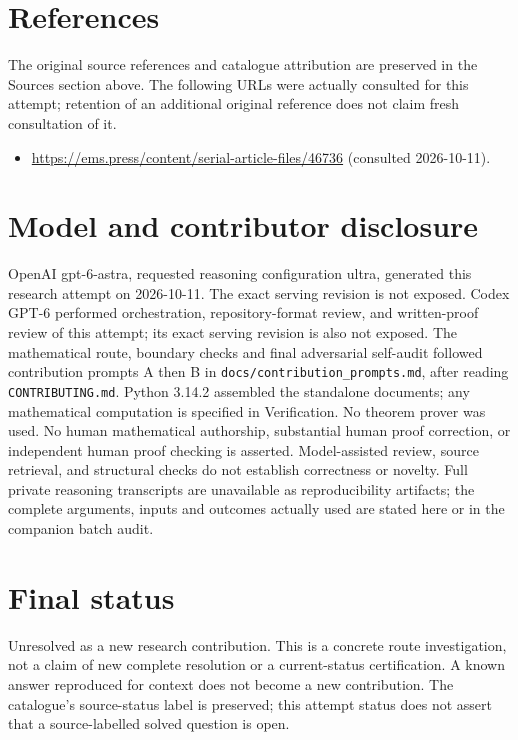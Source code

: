 \documentclass[11pt]{article}
\begin{document}
\section{References}
The original source references and catalogue attribution are preserved in the
Sources section above. The following URLs were actually consulted for this attempt;
retention of an additional original reference does not claim fresh consultation of it.
\begin{itemize}
\item \url{https://ems.press/content/serial-article-files/46736} (consulted 2026-10-11). 
\end{itemize}
\section{Model and contributor disclosure}
OpenAI gpt-6-astra, requested reasoning configuration ultra, generated this research
attempt on 2026-10-11. The exact serving revision is not exposed. Codex GPT-6
performed orchestration, repository-format review, and written-proof review of this attempt; its exact serving revision
is also not exposed. The mathematical route, boundary checks and final adversarial
self-audit followed contribution prompts A then B in
\texttt{docs/contribution\_prompts.md}, after reading \texttt{CONTRIBUTING.md}.
Python 3.14.2 assembled the standalone documents; any mathematical computation is
specified in Verification. No theorem prover was used. No human mathematical
authorship, substantial human proof correction, or independent human proof checking
is asserted. Model-assisted review, source retrieval, and structural checks do not
establish correctness or novelty. Full private reasoning transcripts are unavailable
as reproducibility artifacts; the complete arguments, inputs and outcomes actually
used are stated here or in the companion batch audit.
\section{Final status}
Unresolved as a new research contribution. This is a concrete route investigation,
not a claim of new complete resolution or a current-status certification. A known
answer reproduced for context does not become a new contribution. The catalogue's
source-status label is preserved; this attempt status does not assert that a
source-labelled solved question is open.
\end{document}
